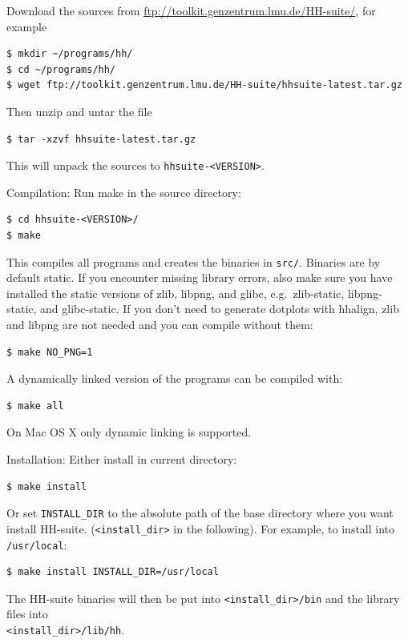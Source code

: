 \documentclass[11pt,a4paper]{article}
\begin{document}
\begin{enum}

\item Download the sources from \url{ftp://toolkit.genzentrum.lmu.de/HH-suite/}, for example
\begin{verbatim}
$ mkdir ~/programs/hh/
$ cd ~/programs/hh/
$ wget ftp://toolkit.genzentrum.lmu.de/HH-suite/hhsuite-latest.tar.gz 
\end{verbatim}
\vspace{2mm}


\item Then unzip and untar the file
\begin{verbatim}
$ tar -xzvf hhsuite-latest.tar.gz
\end{verbatim}
This will unpack the sources to \verb`hhsuite-<VERSION>`.
\vspace{2mm}


\item Compilation: Run make in the source directory:
\begin{verbatim}
$ cd hhsuite-<VERSION>/
$ make
\end{verbatim}
This compiles all programs and creates the binaries in \verb`src/`. Binaries are by default static. If you encounter
missing library errors, also make sure you have installed the static versions of zlib, libpng, and glibc, e.g.\ zlib-static, libpng-static, and glibc-static.
If you don't need to generate dotplots with hhalign, zlib and libpng are not
needed and you can compile without them:
\begin{verbatim}
$ make NO_PNG=1
\end{verbatim}


A dynamically linked version of the programs can be compiled with:
\begin{verbatim}
$ make all
\end{verbatim}
On Mac OS X only dynamic linking is supported.
\vspace{2mm}


\item Installation: Either install in current directory:
\begin{verbatim}
$ make install
\end{verbatim}
Or set \verb`INSTALL_DIR` to the absolute path of the base directory where you want install HH-suite.
(\verb`<install_dir>` in the following). For example, to install into \verb`/usr/local`:
\begin{verbatim}
$ make install INSTALL_DIR=/usr/local
\end{verbatim}
The HH-suite binaries will then be put into \verb`<install_dir>/bin` and the library files into\\
\verb`<install_dir>/lib/hh`.
\vspace{2mm}



\end{enum}
\end{document}
